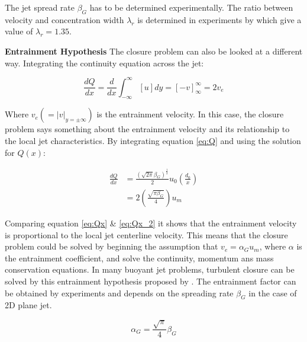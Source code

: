 \noindent The jet spread rate $\beta_G$ has to be determined experimentally. The ratio between velocity and concentration width $\lambda_r$ is determined in experiments by \cite{Kotsovinos} which give a value of $\lambda_r = 1.35$. \newline 

\noindent \textbf{Entrainment Hypothesis} \newline
The closure problem can also be looked at a different way. Integrating the continuity equation across the jet:


\begin{equation}
    \frac{dQ}{dx} = \frac{d}{dx} \int_{-\infty}^{\infty} [u] dy = [-v]_\infty^\infty = 2v_e
    \label{eq:Qx}
\end{equation}

\noindent Where $v_e (= |v|_{y=\pm\infty})$ is the entrainment velocity. In this case, the closure problem says something about the entrainment velocity and its relationship to the local jet characteristics. By integrating equation \ref{eq:Q} and using the solution for $Q(x)$:

\begin{equation}
\begin{split}
     \frac{dQ}{dx} & =  \frac{(\sqrt{2\pi}\beta_G)^\frac{1}{2}}{2} u_0 (\frac{d_0}{x}) \\
    & = 2(\frac{\sqrt{\pi \beta_G}}{4}) u_m
    \end{split}
    \label{eq:Qx_2}
\end{equation}

\noindent Comparing equation \ref{eq:Qx} \& \ref{eq:Qx_2} it shows that the entrainment velocity is proportional to the local jet centerline velocity. This means that the closure problem could be solved by beginning the assumption that $v_e = \alpha_G u_m$, where $\alpha$ is the entrainment coefficient, and solve the continuity, momentum ans mass conservation equations. In many buoyant jet problems, turbulent closure can be solved by this entrainment hypothesis proposed by \cite{Morton}. The entrainment factor can be obtained by experiments and depends on the spreading rate $\beta_G$ in the case of 2D plane jet.

\begin{equation}
    \alpha_G = \frac{\sqrt{\pi}}{4} \beta_G
\end{equation}



